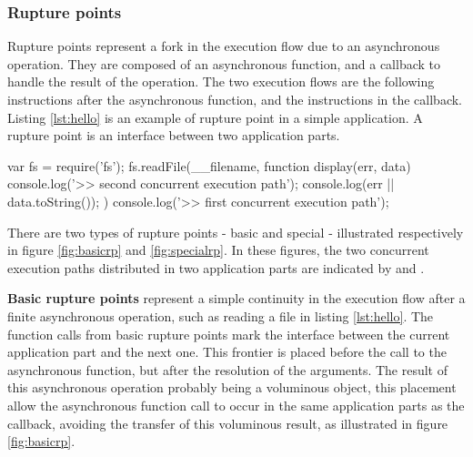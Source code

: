 \subsubsection{Rupture points}

Rupture points represent a fork in the execution flow due to an asynchronous operation.
They are composed of an asynchronous function, and a callback to handle the result of the operation.
The two execution flows are the following instructions after the asynchronous function, and the instructions in the callback.
Listing \ref{lst:hello} is an example of rupture point in a simple application.
A rupture point is an interface between two application parts.

\begin{code}[Javascript, caption={Example of a rupture point : an asynchronous function call, \texttt{fs.readFile()}, with a callback parameter, \texttt{function display}},label={lst:hello}]
var fs = require('fs');
fs.readFile(__filename, function display(err, data) {
  console.log('>> second concurrent execution path');
  console.log(err || data.toString());
})
console.log('>> first concurrent execution path');
\end{code}


There are two types of rupture points - basic and special - illustrated respectively in figure \ref{fig:basicrp} and \ref{fig:specialrp}.
In these figures, the two concurrent execution paths distributed in two application parts are indicated by  and .

\textbf{Basic rupture points} represent a simple continuity in the execution flow after a finite asynchronous operation, such as reading a file in listing \ref{lst:hello}.
The function calls from basic rupture points mark the interface between the current application part and the next one.
This frontier is placed before the call to the asynchronous function, but after the resolution of the arguments.
The result of this asynchronous operation probably being a voluminous object, this placement allow the asynchronous function call to occur in the same application parts as the callback, avoiding the transfer of this voluminous result, as illustrated in figure \ref{fig:basicrp}.

